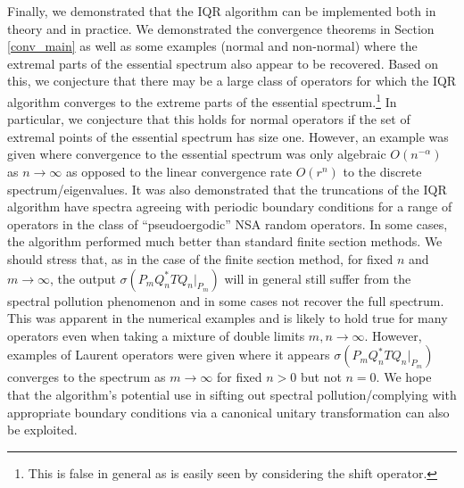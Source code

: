 \documentclass[a4paper,10pt]{article}
\begin{document}
Finally, we demonstrated that the IQR algorithm can be implemented both in theory and in practice. We demonstrated the convergence theorems in Section \ref{conv_main} as well as some examples (normal and non-normal) where the extremal parts of the essential spectrum also appear to be recovered. Based on this, we conjecture that there may be a large class of operators for which the IQR algorithm converges to the extreme parts of the essential spectrum.\footnote{This is false in general as is easily seen by considering the shift operator.} In particular, we conjecture that this holds for normal operators if the set of extremal points of the essential spectrum has size one. However, an example was given where convergence to the essential spectrum was only algebraic $O(n^{-\alpha})$ as $n\rightarrow\infty$ as opposed to the linear convergence rate $O(r^n)$ to the discrete spectrum/eigenvalues. It was also demonstrated that the truncations of the IQR algorithm have spectra agreeing with periodic boundary conditions for a range of operators in the class of ``pseudoergodic'' NSA random operators. %
In some cases, the algorithm performed much better than standard finite section methods. We should stress that, as in the case of the finite section method, for fixed $n$ and $m\rightarrow\infty$, the output $\sigma(P_mQ_n^*TQ_n|_{P_{m}})$ will in general still suffer from the spectral pollution phenomenon and in some cases not recover the full spectrum. This was apparent in the numerical examples and is likely to hold true for many operators even when taking a mixture of double limits $m,n\rightarrow\infty$. However, examples of Laurent operators were given where it appears $\sigma(P_mQ_n^*TQ_n|_{P_{m}})$ converges to the spectrum as $m\rightarrow\infty$ for fixed $n>0$ but not $n=0$. We hope that the algorithm's potential use in sifting out spectral pollution/complying with appropriate boundary conditions via a canonical unitary transformation can also be exploited. %
\end{document}
